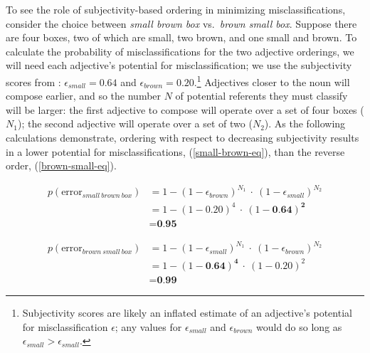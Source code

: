 \documentclass[preprint,authoryear]{elsarticle}\frenchspacing
\begin{document}
To see the role of subjectivity-based ordering in minimizing misclassifications, consider the choice between \emph{small brown box} vs.~\emph{brown small box}. Suppose there are four boxes, two of which are small, two brown, and one small and brown. 
To calculate the probability of misclassifications for the two adjective orderings, we will need each adjective's potential for misclassification; we use the subjectivity scores from \cite{scontrasetal2017adjectives}: $\epsilon_{small} = 0.64$ and $\epsilon_{brown} = 0.20$.\footnote{Subjectivity scores are likely an inflated estimate of an adjective's potential for misclassification $\epsilon$; any values for $\epsilon_{small}$ and $\epsilon_{brown}$ would do so long as $\epsilon_{small} > \epsilon_{small}$.} Adjectives closer to the noun will compose earlier, and so the number $N$ of potential referents they must classify will be larger: the first adjective to compose will operate over a set of four boxes ($N_1$); the second adjective will operate over a set of two ($N_2$). As the following calculations demonstrate, ordering with respect to decreasing subjectivity results in a lower potential for misclassifications, (\ref{small-brown-eq}), than the reverse order, (\ref{brown-small-eq}).

\begin{align} \label{small-brown-eq}
p(\textrm{error}_{small\ brown\ box}) &= 1 - (1-\epsilon_{brown})^{N_1}\ \cdot\  (1-\epsilon_{small})^{N_2} \nonumber\\
&= 1 - (1-0.20)^{4}\ \cdot\  (1-\textbf{0.64})^{\textbf{2}} \nonumber\\
&= \textbf{0.95}
\end{align}

\begin{align} \label{brown-small-eq}
p(\textrm{error}_{brown\ small\ box}) &= 1 - (1-\epsilon_{small})^{N_1}\ \cdot\  (1-\epsilon_{brown})^{N_2} \nonumber\\
&= 1 - (1-\textbf{0.64})^{\textbf{4}}\ \cdot\  (1-0.20)^{2} \nonumber\\
&= \textbf{0.99}
\end{align}
\end{document}
